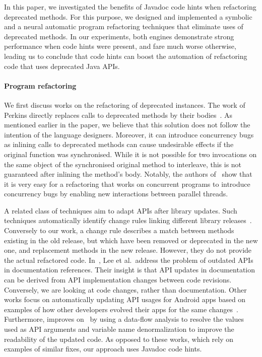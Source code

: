 \documentclass[sigconf,review,anonymous]{acmart}
\begin{document}
In this paper, we investigated the benefits of Javadoc code hints when
refactoring deprecated methods.  For this purpose, we designed and
implemented a symbolic and a neural automatic program refactoring techniques
that eliminate uses of deprecated methods.  In our experiments, both engines
demonstrate strong performance when code hints were present, and fare much
worse otherwise, leading us to conclude that code hints can boost the
automation of refactoring code that uses deprecated Java APIs.

\paragraph{Program refactoring}

We first discuss works on the refactoring of deprecated instances.  The work
of Perkins directly replaces calls to deprecated methods by their
bodies~\cite{DBLP:conf/paste/Perkins05}.  As mentioned earlier in the paper,
we believe that this solution does not follow the intention of the language
designers.  Moreover, it can introduce concurrency bugs as inlining calls to
deprecated methods can cause undesirable effects if the original function
was synchronised.  While it is not possible for two invocations on the same
object of the synchronised original method to interleave, this is not
guaranteed after inlining the method's body.  Notably, the authors
of~\cite{10.1007/978-3-642-14107-2_11} show that it is very easy for a
refactoring that works on concurrent programs to introduce concurrency bugs
by enabling new interactions between parallel threads.


A related class of techniques aim to adapt APIs after library updates.  Such
techniques automatically identify change rules linking different library
releases~\cite{DBLP:conf/icse/WuGAK10,DBLP:conf/kbse/Huang0PW021}. 
Conversely to our work, a change rule describes a match between methods
existing in the old release, but which have been removed or deprecated in
the new one, and replacement methods in the new release.  However, they do
not provide the actual refactored code. 
In~\cite{DBLP:journals/tse/LeeWCK21}, Lee et al.~address the problem of
outdated APIs in documentation references.  Their insight is that API
updates in documentation can be derived from API implementation changes
between code revisions.  Conversely, we are looking at code changes, rather
than documentation.  Other works focus on automatically updating API usages
for Android apps based on examples of how other developers evolved their
apps for the same
changes~\cite{DBLP:conf/issta/FazziniXO19,DBLP:conf/iwpc/HaryonoTKSML0J20}. 
Furthermore, \cite{DBLP:journals/ese/HaryonoTLJLKSM22} improves
on~\cite{DBLP:conf/iwpc/HaryonoTKSML0J20} by using a data-flow analysis to
resolve the values used as API arguments and variable name denormalization
to improve the readability of the updated code.  As opposed to these works,
which rely on examples of similar fixes, our approach uses Javadoc code
hints.
\end{document}
